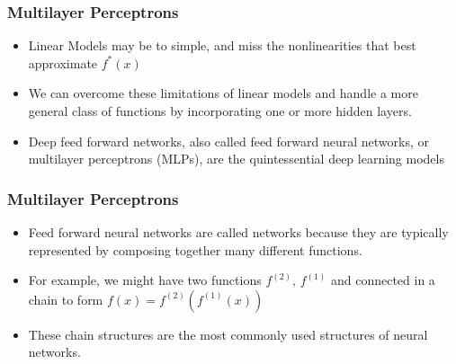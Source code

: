 \documentclass[
  shownotes,
  xcolor={svgnames},
  hyperref={colorlinks,citecolor=DarkBlue,linkcolor=DarkRed,urlcolor=DarkBlue}
  , aspectratio=169]{beamer}
\begin{document}
\begin{frame}
\frametitle{Multilayer Perceptrons}

\begin{itemize}
    \item Linear Models may be to simple, and miss the nonlinearities that best approximate $f^*(x)$
    \medskip
    \item We can overcome these limitations of linear models and handle a more general class of functions by incorporating one or more hidden layers.
    \medskip
    \item Deep feed forward networks, also called feed forward neural networks, or multilayer perceptrons (MLPs), are the quintessential deep learning models
\end{itemize}

\end{frame}
\begin{frame}
\frametitle{Multilayer Perceptrons}

\begin{itemize}

\item Feed forward neural networks are called networks because they are typically represented by composing together many different functions. 
\medskip
\item For example, we might have two functions $f^{(2)}$, $f^{(1)}$ and connected in a chain to form $f(x)=f^{(2)}(f^{(1)}(x))$ 
\medskip
 \item These chain structures are the most commonly used structures of neural networks. 
\end{itemize}
\end{frame}
\end{document}
